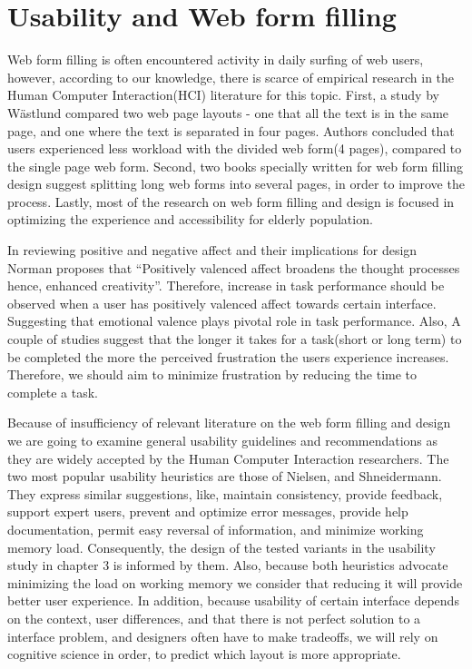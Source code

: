 \documentclass[a4paper]{report}
\begin{document}
	\section{Usability and Web form filling}	
		Web form filling is often encountered activity in daily surfing of web users, however, according to our knowledge, there is scarce of empirical research in the Human Computer Interaction(HCI) literature for this topic. First, a study by Wästlund\cite{Wastlund20081229} compared two web page layouts - one that all the text is in the same page, and one where the text is separated in four pages. Authors concluded that users experienced less workload with the divided web form(4 pages), compared to the single page web form. Second, two books specially written for web form filling design\cite{jarrett2009forms,wroblewski2008web} suggest splitting long web forms into several pages, in order to improve the process. Lastly, most of the research on web form filling and design is focused in optimizing the experience and accessibility for elderly population\cite{sayago2012selective,chadwick2003web,lines2006online,sayago2007some}.
		
		In reviewing positive and negative affect and their implications for design Norman\cite{norman2002emotion} proposes that ``Positively valenced affect broadens the thought processes hence, enhanced creativity''. Therefore, increase in task performance should be observed when a user has positively valenced affect towards certain interface. Suggesting that emotional valence plays pivotal role in task performance. Also, A couple of studies suggest that the longer it takes for a task(short or long term) to be completed the more the perceived frustration the users experience increases\cite{mendoza2005usability,bessiere2004social}. Therefore, we should aim to minimize frustration by reducing the time to complete a task.
			
		Because of insufficiency of relevant literature on the web form filling and design we are going to examine general usability guidelines and recommendations as they are widely accepted by the Human Computer Interaction researchers. The two most popular usability heuristics are those of Nielsen\cite{nielsen1990heuristic}, and Shneidermann\cite{shneiderman1992designing}. They express similar suggestions, like, maintain consistency, provide feedback, support expert users, prevent and optimize error messages, provide help documentation, permit easy reversal of information, and minimize working memory load. Consequently, the design of the tested variants in the usability study in chapter 3 is informed by them. Also, because both heuristics advocate minimizing the load on working memory we consider that reducing it will provide better user experience. In addition, because usability of certain interface depends on the context, user differences, and that there is not perfect solution to a interface problem, and designers often have to make tradeoffs\cite{norman1986user}, we will rely on cognitive science in order, to predict which layout is more appropriate.
\end{document}
